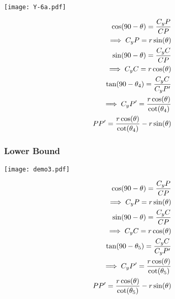\begin{minipage}[t]{0.5\textwidth}
\texttt{[image: Y-6a.pdf]}  
\end{minipage}
\begin{minipage}[t]{0.5\textwidth}
\vspace{-2in}
\begin{equation*}
\centering
\begin{aligned}
\cos(90-\theta)=\frac{C_{y}P}{CP}\\
\implies C_{y}P=r\sin(\theta)\\
\sin(90-\theta) = \frac{C_{y}C}{CP}\\
\implies C_{y}C = r\cos(\theta)\\
\tan(90-\theta_4) = \frac{C_{y}C}{C_{y}P'}\\
\implies C_{y}P' = \frac{r\cos(\theta)}{\cot(\theta_4)}\\
PP' = \frac{r\cos(\theta)}{\cot(\theta_4)} - r\sin(\theta)
\end{aligned}
\end{equation*}
\end{minipage}







\subsubsection{Lower Bound}

\begin{minipage}[t]{0.5\textwidth}
\texttt{[image: demo3.pdf]}   
\end{minipage}
\begin{minipage}[t]{0.5\textwidth}
\vspace{-2in}
\begin{equation*}
\centering
\begin{aligned}
\cos(90-\theta)=\frac{C_{y}P}{CP}\\
\implies C_{y}P=r\sin(\theta)\\
\sin(90-\theta) = \frac{C_{y}C}{CP}\\
\implies C_{y}C = r\cos(\theta)\\
\tan(90-\theta_5) = \frac{C_{y}C}{C_{y}P'}\\
\implies C_{y}P' = \frac{r\cos(\theta)}{\cot(\theta_5)}\\
PP' = \frac{r\cos(\theta)}{\cot(\theta_5)} - r\sin(\theta)
\end{aligned}
\end{equation*}
\end{minipage}








